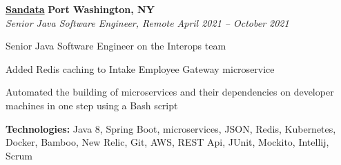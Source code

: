 %
    \headerrow
        {\textbf{\href{https://www.sandata.com/}{Sandata}}}
        {\textbf{Port Washington, NY}}
    \\
    \headerrow
        {\emph{Senior Java Software Engineer, Remote}}
        {\emph{April 2021 -- October 2021}}
    \begin{itemize*}
        \item Senior Java Software Engineer on the Interops team
        \item Added Redis caching to Intake Employee Gateway microservice
        \item Automated the building of microservices and their dependencies on developer machines in one step using a Bash script
    \end{itemize*}

    \hspace{1.0em}
        {\textbf{Technologies:} Java 8, Spring Boot, microservices, JSON, Redis, Kubernetes, Docker, Bamboo, New Relic,
        Git, AWS, REST Api, JUnit, Mockito, Intellij, Scrum}

